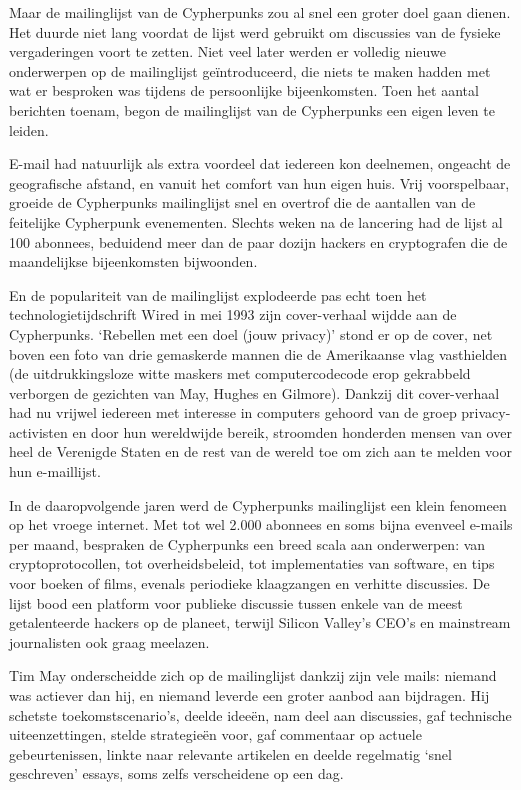\documentclass[
  a5paper,
  smalldemyvopaper,11pt,twoside,onecolumn,openright,extrafontsizes,
hidelinks]{memoir}
\begin{document}
Maar de mailinglijst van de Cypherpunks zou al snel een groter doel gaan
dienen. Het duurde niet lang voordat de lijst werd gebruikt om
discussies van de fysieke vergaderingen voort te zetten. Niet veel later
werden er volledig nieuwe onderwerpen op de mailinglijst geïntroduceerd,
die niets te maken hadden met wat er besproken was tijdens de
persoonlijke bijeenkomsten. Toen het aantal berichten toenam, begon de
mailinglijst van de Cypherpunks een eigen leven te leiden.

E-mail had natuurlijk als extra voordeel dat iedereen kon deelnemen,
ongeacht de geografische afstand, en vanuit het comfort van hun eigen
huis. Vrij voorspelbaar, groeide de Cypherpunks mailinglijst snel en
overtrof die de aantallen van de feitelijke Cypherpunk evenementen.
Slechts weken na de lancering had de lijst al 100 abonnees, beduidend
meer dan de paar dozijn hackers en cryptografen die de maandelijkse
bijeenkomsten bijwoonden.

En de populariteit van de mailinglijst explodeerde pas echt toen het
technologietijdschrift Wired in mei 1993 zijn cover-verhaal wijdde aan
de Cypherpunks. `Rebellen met een doel (jouw privacy)' stond er op de
cover, net boven een foto van drie gemaskerde mannen die de Amerikaanse
vlag vasthielden (de uitdrukkingsloze witte maskers met computercodecode
erop gekrabbeld verborgen de gezichten van May, Hughes en Gilmore).
Dankzij dit cover-verhaal had nu vrijwel iedereen met interesse in
computers gehoord van de groep privacy-activisten en door hun
wereldwijde bereik, stroomden honderden mensen van over heel de
Verenigde Staten en de rest van de wereld toe om zich aan te melden voor
hun e-maillijst.

In de daaropvolgende jaren werd de Cypherpunks mailinglijst een klein
fenomeen op het vroege internet. Met tot wel 2.000 abonnees en soms
bijna evenveel e-mails per maand, bespraken de Cypherpunks een breed
scala aan onderwerpen: van cryptoprotocollen, tot overheidsbeleid, tot
implementaties van software, en tips voor boeken of films, evenals
periodieke klaagzangen en verhitte discussies. De lijst bood een
platform voor publieke discussie tussen enkele van de meest
getalenteerde hackers op de planeet, terwijl Silicon Valley's CEO's en
mainstream journalisten ook graag meelazen.

Tim May onderscheidde zich op de mailinglijst dankzij zijn vele mails:
niemand was actiever dan hij, en niemand leverde een groter aanbod aan
bijdragen. Hij schetste toekomstscenario's, deelde ideeën, nam deel aan
discussies, gaf technische uiteenzettingen, stelde strategieën voor, gaf
commentaar op actuele gebeurtenissen, linkte naar relevante artikelen en
deelde regelmatig `snel geschreven' essays, soms zelfs verscheidene op
een dag.
\end{document}
